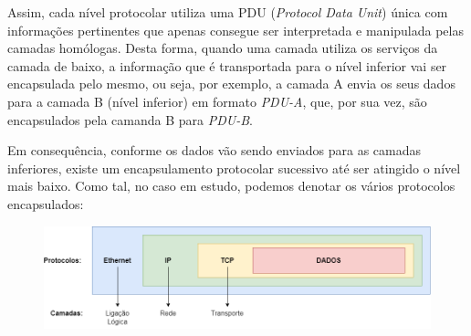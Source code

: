     \par Assim, cada nível protocolar utiliza uma PDU (\textit{Protocol Data Unit}) única com informações pertinentes que apenas consegue ser interpretada e manipulada pelas camadas homólogas. Desta forma, quando uma camada utiliza os serviços da camada de baixo, a informação que é transportada para o nível inferior vai ser encapsulada pelo mesmo, ou seja, por exemplo, a camada A envia os seus dados para a camada B (nível inferior) em formato \textit{PDU-A}, que, por sua vez, são encapsulados pela camanda B para \textit{PDU-B}.
    
    \par Em consequência, conforme os dados vão sendo enviados para as camadas inferiores, existe um encapsulamento protocolar sucessivo até ser atingido o nível mais baixo. Como tal, no caso em estudo, podemos denotar os vários protocolos encapsulados:

    
    \begin{figure}[H]
    \centering
    \includegraphics[width=450pt]{prints/Questao3/encapsulamento.png}
    \label{questao3-resposta2}
    \end{figure}


